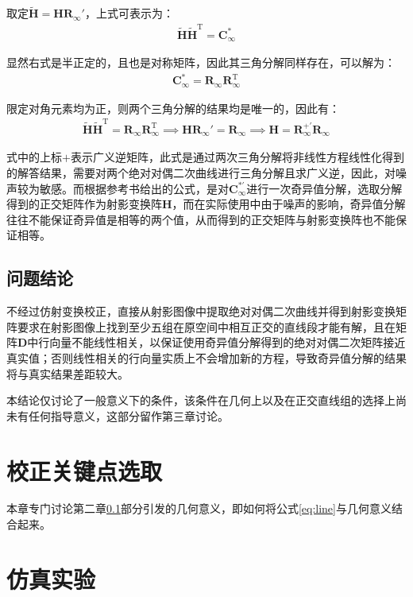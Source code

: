 \documentclass[11pt]{article}
\begin{document}
取定$\mathbf{\tilde{H}=HR_\infty'}$，上式可表示为：
\begin{align*}
  \tilde{\mathbf{{H}}}\tilde{\mathbf{H}}^\mathrm{T}=\mathbf{C_\infty^*}
\end{align*}\par
显然右式是半正定的，且也是对称矩阵，因此其三角分解同样存在，可以解为：
\begin{align*}
  \mathbf{C_\infty^*}=\mathbf{R_\infty R_\infty^\mathrm{T}}
\end{align*}\par
限定对角元素均为正，则两个三角分解的结果均是唯一的，因此有：
\begin{align}
  \tilde{\mathbf{{H}}}\tilde{\mathbf{H}}^\mathrm{T}=\mathbf{R_\infty R_\infty^\mathrm{T}}\implies\mathbf{HR_\infty'=R_\infty}\implies\mathbf{H=R_\infty^{+'}R_\infty}
  \label{eq:Cholesky}
\end{align}\par
式中的上标$+$表示广义逆矩阵，此式是通过两次三角分解将非线性方程线性化得到的解答结果，需要对两个绝对对偶二次曲线进行三角分解且求广义逆，因此，对噪声较为敏感。而根据参考书\cite{hartley2003multiple}给出的公式，是对$\mathbf{C_\infty^{*'}}$进行一次奇异值分解，选取分解得到的正交矩阵作为射影变换阵$\mathbf{H}$，而在实际使用中由于噪声的影响，奇异值分解往往不能保证奇异值是相等的两个值，从而得到的正交矩阵与射影变换阵也不能保证相等。
\subsection{问题结论}
\label{sec:问题结论}
不经过仿射变换校正，直接从射影图像中提取绝对对偶二次曲线并得到射影变换矩阵要求在射影图像上找到至少五组在原空间中相互正交的直线段才能有解，且在矩阵$\mathbf{D}$中行向量不能线性相关，以保证使用奇异值分解得到的绝对对偶二次矩阵接近真实值；否则线性相关的行向量实质上不会增加新的方程，导致奇异值分解的结果将与真实结果差距较大。\par
本结论仅讨论了一般意义下的条件，该条件在几何上以及在正交直线组的选择上尚未有任何指导意义，这部分留作第三章讨论。
\section{校正关键点选取}
本章专门讨论第二章\ref{sec:问题结论}部分引发的几何意义，即如何将公式\ref{eq:line}与几何意义结合起来。
\section{仿真实验}
\newpage
\printbibliography[heading=bibliography,title=参考文献]
\end{document}
